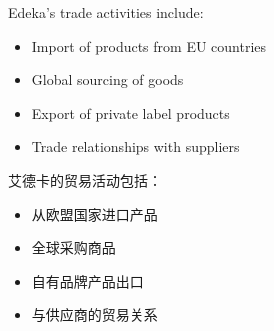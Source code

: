 Edeka's trade activities include:
\begin{itemize}
    \item Import of products from EU countries
    \item Global sourcing of goods
    \item Export of private label products
    \item Trade relationships with suppliers
\end{itemize}

艾德卡的贸易活动包括：
\begin{itemize}
    \item 从欧盟国家进口产品
    \item 全球采购商品
    \item 自有品牌产品出口
    \item 与供应商的贸易关系
\end{itemize}
